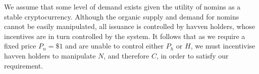 


\noindent We assume that some level of demand exists given the utility of nomins as a stable
cryptocurrency. Although the organic supply and demand for nomins cannot be easily
manipulated, all issuance is controlled by havven holders, whose incentives are in turn
controlled by the system. It follows that as we require a fixed price \(P_n = \$1\)
and are unable to control either \(P_h\) or \(H\), we must incentivise havven holders
to manipulate \(N\), and therefore \(C\), in order to satisfy our requirement.
